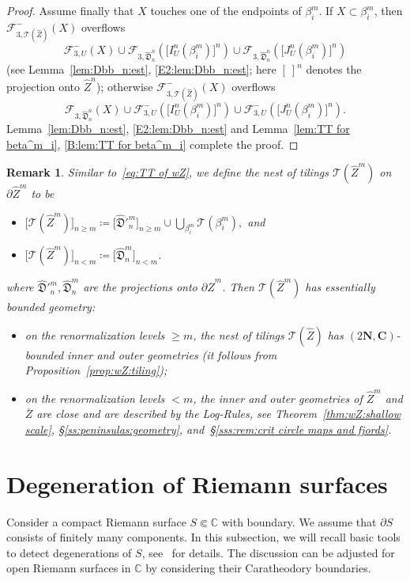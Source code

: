 \documentclass{amsart}
\newcommand{\1}{{\mathbb 1 }}
\newcommand{\Fam}{{\mathcal F}}
\newcommand\TT{\mathcal{T}}
\newcommand{\bC}{{\mathbf{C}}}
\newcommand{\bN}{{\mathbf N}}
\newcommand{\wZ}{{\widehat Z}}
\newcommand{\C}{\mathbb{C}}
\newcommand{\Dbb}{{\mathfrak{D}}}
\newtheorem{rem}[thm]{Remark}
\theoremstyle{remark}
\numberwithin{equation}{section}
\theoremstyle{definition}
\begin{document}
\begin{proof}
Assume finally that $X$ touches one of the endpoints of $\beta^m_i$. If $X\subset \beta^m_i$, then $\Fam^-_{3,\TT(\wZ)}(X)$ overflows 
\[ \Fam_{3,U}^-(X)\cup \Fam_{3,\widehat \Dbb^n_n}\left(\big[I^n_U(\beta^m_i)\big]^n \right)\cup \Fam_{3,\widehat \Dbb^n_n}\left(\big[J^n_U(\beta^m_i)\big]^n \right)\]
(see Lemma~\ref{lem:Dbb_n:est}, \ref{E2:lem:Dbb_n:est}; here $[\ ]^n$ denotes the projection onto $\wZ^n$);
otherwise 
$\Fam^-_{3,\TT(\wZ)}(X)$ overflows 
\[\Fam_{3,\widehat \Dbb^n_n}\left(X \right)\cup  \Fam_{3,U}^-\left(\big[I^n_U(\beta^m_i)\big]^n \right)\cup   \Fam_{3,U}^-\left(\big[J^n_U(\beta^m_i)\big]^n \right).\]
Lemma~\ref{lem:Dbb_n:est}, \ref{E2:lem:Dbb_n:est} and Lemma~\ref{lem:TT for beta^m_i}, \ref{B:lem:TT for beta^m_i} complete the proof.
\end{proof}

\begin{rem} \label{rem:TT:wZ^m}Similar to~\eqref{eq:TT of wZ}, we define the nest of tilings $\TT(\wZ^m)$ on $\partial \wZ^m$ to be
\begin{itemize}
\item $\big[\TT(\wZ^m)\big]_{n\ge m}\coloneqq \big[\widehat \Dbb'^m_n\big]_{n\ge m} \cup \bigcup_{\beta^m_i} \TT(\beta^m_i),$ and
\item  $\big[\TT(\wZ^m)\big]_{n< m}\coloneqq \big[\widehat \Dbb^m_n\big]_{n< m} $.
\end{itemize}
where  $\widehat \Dbb'^m_n, \widehat \Dbb^m_n$ are the projections onto $\partial \wZ^m$. Then  $\TT(\wZ^m)$ has \emph{essentially bounded geometry}:
\begin{itemize}
\item on the renormalization levels $\ge m$,  the nest of tilings $\TT(\wZ)$ has $(2\bN, \bC)$-bounded inner and outer geometries (it follows from Proposition~\ref{prop:wZ:tiling});
\item on the renormalization levels $<m$, the inner and outer geometries of $\wZ^m$ and $\overline Z$ are close and are described by the Log-Rules, see Theorem~\ref{thm:wZ:shallow scale}, \S\ref{ss:peninsulas:geometry}, and~\S\ref{sss:rem:crit circle maps and fjords}.
\end{itemize}
\end{rem}

\appendix






\section{Degeneration of Riemann surfaces}
Consider a compact Riemann surface $S\Subset \C$ with boundary. We assume that $\partial S$ consists of finitely many components. In this subsection, we will recall basic tools to detect degenerations of $S$, see~\cite{A,L-book,KL} for details. The discussion can be adjusted for open Riemann surfaces in $\C$ by considering their Caratheodory boundaries.
\end{document}
